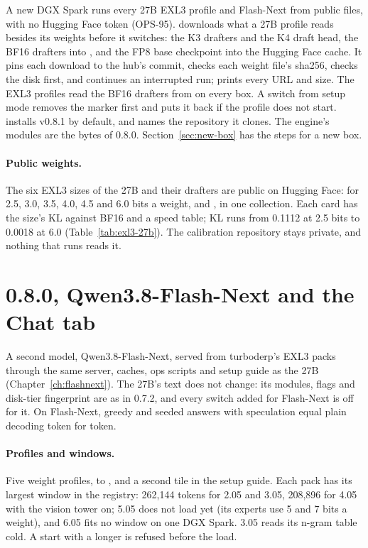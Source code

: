 A new DGX Spark runs every 27B EXL3 profile and Flash-Next from public files, with no Hugging Face token (OPS-95).  downloads what a 27B profile reads besides its weights before it switches: the K3 drafters and the K4 draft head, the BF16 drafters into , and the FP8 base checkpoint into the Hugging Face cache. It pins each download to the hub's commit, checks each weight file's sha256, checks the disk first, and continues an interrupted run;  prints every URL and size. The EXL3 profiles read the BF16 drafters from  on every box. A switch from setup mode removes the marker first and puts it back if the profile does not start.  installs v0.8.1 by default, and  names the repository it clones. The engine's modules are the bytes of 0.8.0. Section~\ref{sec:new-box} has the steps for a new box.

\paragraph{Public weights.} The six EXL3 sizes of the 27B and their drafters are public on Hugging Face:  for 2.5, 3.0, 3.5, 4.0, 4.5 and 6.0 bits a weight, and , in one collection. Each card has the size's KL against BF16 and a speed table; KL runs from 0.1112 at 2.5 bits to 0.0018 at 6.0 (Table~\ref{tab:exl3-27b}). The calibration repository stays private, and nothing that runs reads it.


\section{0.8.0, Qwen3.8-Flash-Next and the Chat tab}\label{sec:changelog-080}

A second model, Qwen3.8-Flash-Next, served from turboderp's EXL3 packs through the same server, caches, ops scripts and setup guide as the 27B (Chapter~\ref{ch:flashnext}). The 27B's text does not change: its modules, flags and disk-tier fingerprint are as in 0.7.2, and every switch added for Flash-Next is off for it. On Flash-Next, greedy and seeded answers with speculation equal plain decoding token for token.

\paragraph{Profiles and windows.} Five weight profiles,  to , and a second tile in the setup guide. Each pack has its largest window in the registry: 262,144 tokens for 2.05 and 3.05, 208,896 for 4.05 with the vision tower on; 5.05 does not load yet (its experts use 5 and 7 bits a weight), and 6.05 fits no window on one DGX Spark. 3.05 reads its n-gram table cold. A start with a longer  is refused before the load.

